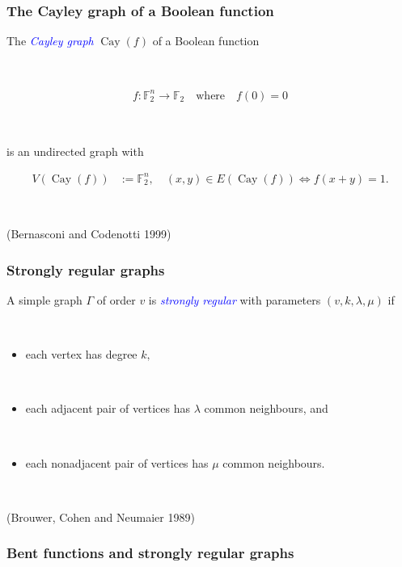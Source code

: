 \documentclass[pdf,sprung,slideColor,nocolorBG]{beamer}
\newenvironment{colortheme}[1]{
\def\ProvidesPackageRCS $##1${\relax}
\renewcommand{\ProcessOptions}{\relax}
\makeatletter

\makeatother
}{}
\newcommand{\slidecite}[1]{\tiny{(#1)}\normalsize{}}
\newcommand{\mb}[1]{\mathbb{#1}}
\newcommand{\Emph}[1]{\emph{\textcolor{blue}{#1}}}
\newcommand{\To}{\rightarrow}
\newcommand{\Cay}[1]{\operatorname{Cay}\left(#1\right)}
\newcommand{\F}{\mb{F}}
\begin{document}

\begin{colortheme}{seagull}

\begin{frame}
\frametitle{The Cayley graph of a Boolean function}
The \Emph{Cayley graph} $\Cay{f}$ of a Boolean function

~

\begin{align*}
%
f : \F_2^n \To \F_2 \quad \text{where} \quad f(0) = 0
%
\end{align*}

~

is
an undirected graph with

\begin{align*}
V(\Cay{f}) &:= \F_2^n, \quad (x,y) \in E(\Cay{f}) \Leftrightarrow f(x+y) = 1.
\end{align*}

~

\slidecite{Bernasconi and Codenotti 1999}
\end{frame}

\begin{frame}
\frametitle{Strongly regular graphs}
A simple graph $\Gamma$ of order $v$ is \Emph{strongly regular} with parameters
$(v,k,\lambda,\mu)$ if

~

\begin{itemize}
 \item
each vertex has degree $k,$

~
 \item
each adjacent pair of vertices has $\lambda$ common neighbours, and

~
\item
each nonadjacent pair of vertices has $\mu$ common neighbours.
\end{itemize}

~

\slidecite{Brouwer, Cohen and Neumaier 1989}

\end{frame}

\begin{frame}
\frametitle{Bent functions and strongly regular graphs}


\end{frame}
\end{colortheme}
\end{document}
